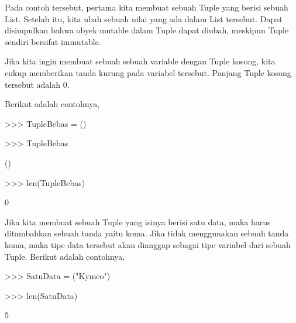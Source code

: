 Pada contoh tersebut, pertama kita membuat sebuah Tuple yang berisi sebuah List. Setelah itu, kita ubah sebuah nilai yang ada dalam List tersebut. Dapat disimpulkan bahwa obyek mutable dalam Tuple dapat diubah, meskipun Tuple sendiri bersifat immutable. \par

Jika kita ingin membuat sebuah sebuah variable dengan Tuple kosong, kita cukup memberikan tanda kurung pada variabel tersebut. Panjang Tuple kosong tersebut adalah 0. \par
Berikut adalah contohnya, \par

>>> TupleBebas = () \par
>>> TupleBebas \par
() \par
>>> len(TupleBebas) \par
0 \par

Jika kita membuat sebuah Tuple yang isinya berisi satu data, maka harus ditambahkan sebuah tanda yaitu koma. Jika tidak menggunakan sebuah tanda koma, maka tipe data tersebut akan dianggap sebagai tipe variabel dari sebuah Tuple. Berikut adalah contohnya, \par

>>> SatuData = ("Kymco") \par
>>> len(SatuData) \par
5 \par

